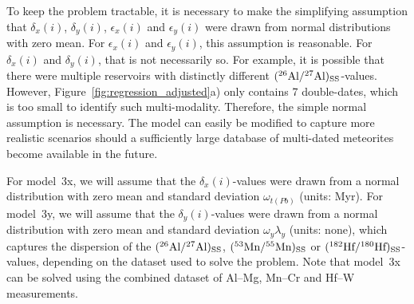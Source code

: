 To keep the problem tractable, it is necessary to make the simplifying
assumption that $\delta_x(i)$, $\delta_y(i)$, $\epsilon_x(i)$ and
$\epsilon_y(i)$ were drawn from normal distributions with zero mean.
For $\epsilon_x(i)$ and $\epsilon_y(i)$, this assumption is
reasonable. For $\delta_x(i)$ and $\delta_y(i)$, that is not
necessarily so. For example, it is possible that there were multiple
reservoirs with distinctly different
$({}^{26}\mbox{Al}/{}^{27}\mbox{Al})_{\rm SS}$-values. However,
Figure~\ref{fig:regression_adjusted}a) only contains 7 double-dates,
which is too small to identify such multi-modality. Therefore, the
simple normal assumption is necessary. The model can easily be
modified to capture more realistic scenarios should a sufficiently
large database of multi-dated meteorites become available in the
future.\medskip

For model~3x, we will assume that the $\delta_x(i)$-values were drawn
from a normal distribution with zero mean and standard deviation
$\omega_{\mathit{t(Pb)}}$ (units: Myr). For model~3y, we will assume
that the $\delta_y(i)$-values were drawn from a normal distribution
with zero mean and standard deviation $\omega_y\lambda_y$ (units:
none), which captures the dispersion of the
$({}^{26}\mbox{Al}/{}^{27}\mbox{Al})_{\rm SS}$,
$({}^{53}\mbox{Mn}/{}^{55}\mbox{Mn})_{\rm SS}$ or
$({}^{182}\mbox{Hf}/{}^{180}\mbox{Hf})_{\rm SS}$-values,
depending on the dataset used to solve the problem. Note that model~3x
can be solved using the combined dataset of Al--Mg, Mn--Cr and Hf--W
measurements.\medskip

